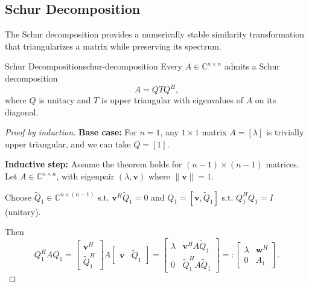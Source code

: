 \documentclass[../../main.tex]{subfiles}
\begin{document}
\subsection{Schur Decomposition}

The Schur decomposition provides a numerically stable similarity transformation that triangularizes a matrix while preserving its spectrum.

\begin{theorem}{Schur Decomposition}{schur-decomposition}
    Every $A \in \mathbb{C}^{n \times n}$ admits a Schur decomposition
    \[
        A = Q T Q^H,
    \]
    where $Q$ is unitary and $T$ is upper triangular with eigenvalues of $A$ on its diagonal.
\end{theorem}

\begin{proof}[Proof by induction]

    \textbf{Base case:}
    For $n=1$, any $1 \times 1$ matrix $A = [\lambda]$ is trivially upper triangular, and we can take $Q = [1]$.

    \textbf{Inductive step:}
    Assume the theorem holds for $(n-1) \times (n-1)$ matrices. Let $A \in \mathbb{C}^{n \times n}$, with eigenpair $(\lambda, \mathbf{v})$ where $\|\mathbf{v}\|=1$.

    Choose $\widetilde{Q}_1 \in \mathbb{C}^{n \times (n-1)}$ s.t. $\mathbf{v}^H \widetilde{Q}_1 = 0$ and $Q_1 = [\mathbf{v}, \widetilde{Q}_1]$ s.t. $Q_1^H Q_1 = I$ (unitary).

    Then
    \[
        Q_1^H A Q_1 =
        \begin{bmatrix}
            \mathbf{v}^H \\
            \widetilde{Q}_1^H
        \end{bmatrix}
        A
        \begin{bmatrix}
            \mathbf{v} & \widetilde{Q}_1
        \end{bmatrix}
        =
        \begin{bmatrix}
            \lambda & \mathbf{v}^H A \widetilde{Q}_1      \\
            0       & \widetilde{Q}_1^H A \widetilde{Q}_1
        \end{bmatrix}
        =:
        \begin{bmatrix}
            \lambda & \mathbf{w}^H \\
            0       & A_1
        \end{bmatrix}.
    \]

\end{proof}
\end{document}
